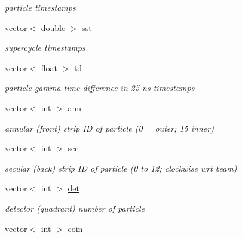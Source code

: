 \begin{DoxyCompactItemize}
\begin{DoxyCompactList}\small\item\em particle timestamps \end{DoxyCompactList}\item 
\hypertarget{classg__clx_a98fc719d6f94e8f1ccecb4978972699d}{vector$<$ double $>$ \hyperlink{classg__clx_a98fc719d6f94e8f1ccecb4978972699d}{sst}}\label{classg__clx_a98fc719d6f94e8f1ccecb4978972699d}

\begin{DoxyCompactList}\small\item\em supercycle timestamps \end{DoxyCompactList}\item 
\hypertarget{classg__clx_a2adb67934c7e26d01a5faa8ccb6c9c15}{vector$<$ float $>$ \hyperlink{classg__clx_a2adb67934c7e26d01a5faa8ccb6c9c15}{td}}\label{classg__clx_a2adb67934c7e26d01a5faa8ccb6c9c15}

\begin{DoxyCompactList}\small\item\em particle-\/gamma time difference in 25 ns timestamps \end{DoxyCompactList}\item 
\hypertarget{classg__clx_ad017e828f9374d881ad4eac9e6ea1818}{vector$<$ int $>$ \hyperlink{classg__clx_ad017e828f9374d881ad4eac9e6ea1818}{ann}}\label{classg__clx_ad017e828f9374d881ad4eac9e6ea1818}

\begin{DoxyCompactList}\small\item\em annular (front) strip I\-D of particle (0 = outer; 15 inner) \end{DoxyCompactList}\item 
\hypertarget{classg__clx_a556dd0017434edf15b8ec9e25437a932}{vector$<$ int $>$ \hyperlink{classg__clx_a556dd0017434edf15b8ec9e25437a932}{sec}}\label{classg__clx_a556dd0017434edf15b8ec9e25437a932}

\begin{DoxyCompactList}\small\item\em secular (back) strip I\-D of particle (0 to 12; clockwise wrt beam) \end{DoxyCompactList}\item 
\hypertarget{classg__clx_af736c71de60d093f141cae033d675387}{vector$<$ int $>$ \hyperlink{classg__clx_af736c71de60d093f141cae033d675387}{det}}\label{classg__clx_af736c71de60d093f141cae033d675387}

\begin{DoxyCompactList}\small\item\em detector (quadrant) number of particle \end{DoxyCompactList}\item 
\hypertarget{classg__clx_a8bab7b24f203a20b19f1cbb565d176ad}{vector$<$ int $>$ \hyperlink{classg__clx_a8bab7b24f203a20b19f1cbb565d176ad}{coin}}\label{classg__clx_a8bab7b24f203a20b19f1cbb565d176ad}


\end{DoxyCompactItemize}
